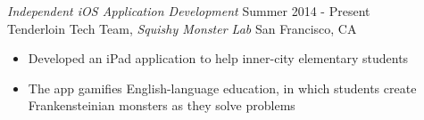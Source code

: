 {\sl Independent iOS Application Development} \hfill Summer 2014 - Present \\
Tenderloin Tech Team, \textit{Squishy Monster Lab} San Francisco, CA
\begin{itemize} \itemsep -2pt %
\item Developed an iPad application to help inner-city elementary students
\item The app gamifies English-language education, in which students create \\ Frankensteinian monsters as they solve problems
\end{itemize}
